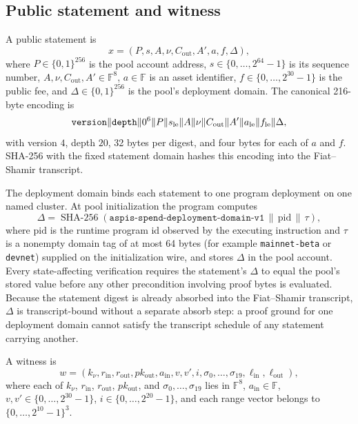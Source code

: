\subsection{Public statement and witness}

\begin{definition}
\label{def:spend-statement}
A public statement is
\[
 x=(P,s,A,\nu,C_{\mathrm{out}},A',a,f,\Delta),
\]
where \(P\in\{0,1\}^{256}\) is the pool account address,
\(s\in\{0,\ldots,2^{64}-1\}\) is its sequence number,
\(A,\nu,C_{\mathrm{out}},A'\in\mathbb F^8\),
\(a\in\mathbb F\) is an asset identifier,
\(f\in\{0,\ldots,2^{30}-1\}\) is the public fee, and
\(\Delta\in\{0,1\}^{256}\) is the pool's deployment domain.
The canonical 216-byte encoding is
\[
 \mathtt{version}\|\mathtt{depth}\|0^6\|P\|s_{\rm le}\|A\|\nu\|
 C_{\mathrm{out}}\|A'\|a_{\rm le}\|f_{\rm le}\|\Delta,
\]
with version \(4\), depth \(20\), 32 bytes per digest, and four bytes for
each of \(a\) and \(f\).  SHA-256 with the fixed statement domain hashes
this encoding into the Fiat--Shamir transcript.
\end{definition}

The deployment domain binds each statement to one program deployment on one
named cluster.  At pool initialization the program computes
\[
 \Delta=\operatorname{SHA-256}(
   \mathtt{aspis\mbox{-}spend\mbox{-}deployment\mbox{-}domain\mbox{-}v1}
   \,\|\,\mathrm{pid}\,\|\,\tau),
\]
where \(\mathrm{pid}\) is the runtime program id observed by the executing
instruction and \(\tau\) is a nonempty domain tag of at most 64 bytes
(for example \texttt{mainnet-beta} or \texttt{devnet}) supplied on the
initialization wire, and stores \(\Delta\) in the pool account.  Every
state-affecting verification requires the statement's \(\Delta\) to equal
the pool's stored value before any other precondition involving proof bytes
is evaluated.  Because the statement digest is already absorbed into the
Fiat--Shamir transcript, \(\Delta\) is transcript-bound without a separate
absorb step: a proof ground for one deployment domain cannot satisfy the
transcript schedule of any statement carrying another.

\begin{definition}
\label{def:spend-witness}
A witness is
\[
 w=(k_\nu,r_{\mathrm{in}},r_{\mathrm{out}},pk_{\mathrm{out}},
    a_{\mathrm{in}},v,v',i,
    \sigma_0,\ldots,\sigma_{19},
    \boldsymbol\ell_{\mathrm{in}},
    \boldsymbol\ell_{\mathrm{out}}),
\]
where each of \(k_\nu\), \(r_{\mathrm{in}}\),
\(r_{\mathrm{out}}\), \(pk_{\mathrm{out}}\), and
\(\sigma_0,\ldots,\sigma_{19}\) lies in \(\mathbb F^8\),
\(a_{\mathrm{in}}\in\mathbb F\),
\(v,v'\in\{0,\ldots,2^{30}-1\}\),
\(i\in\{0,\ldots,2^{20}-1\}\), and each range vector belongs to
\(\{0,\ldots,2^{10}-1\}^3\).
\end{definition}

